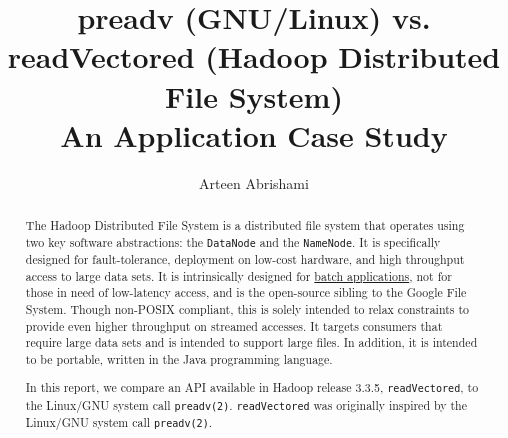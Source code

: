 \documentclass[letterpaper,twocolumn]{article}
\begin{document}
\nocite{*}
\date{}

\title{\Large \bf preadv (GNU/Linux) vs. readVectored (Hadoop Distributed File System) \\
  An Application Case Study}

\author{
{\rm Arteen Abrishami}
}

\maketitle


\begin{abstract}

\noindent The Hadoop Distributed File System is a distributed file system that operates using two key software abstractions:
the \texttt{DataNode} and the \texttt{NameNode}. It is specifically designed for fault-tolerance, deployment on low-cost hardware, and high throughput access to large data sets. It is intrinsically designed for \underline{batch applications}, not for those in need of low-latency access, and is the open-source sibling to the Google File System.
Though non-POSIX compliant, this is solely intended to relax constraints to provide even higher throughput on streamed accesses. It targets consumers that require large data sets and is intended to support large files. In addition, it is intended to be portable, written in the Java programming language.

In this report, we compare an API available in Hadoop release 3.3.5, \texttt{readVectored}, to the Linux/GNU system call \texttt{preadv(2)}. \texttt{readVectored} was originally inspired by the Linux/GNU system call \texttt{preadv(2)}.
\end{abstract}
\end{document}
